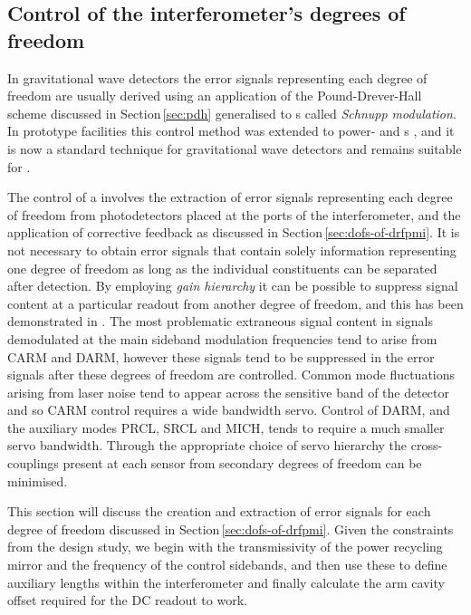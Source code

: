 \subsection{\label{sec:decoupled-sidebands}Control of the interferometer's degrees of freedom}
In gravitational wave detectors the error signals representing each degree of freedom are usually derived using an application of the Pound-Drever-Hall scheme discussed in Section\,\ref{sec:pdh} generalised to \MI{}s called \emph{Schnupp modulation}. In prototype facilities this control method was extended to power- \cite{Regehr1995} and \DRFPMI{}s \cite{Heinzel1998}, and it is now a standard technique for gravitational wave detectors and remains suitable for \ETLF{}.

The control of a \DRFPMI{} involves the extraction of error signals representing each degree of freedom from photodetectors placed at the ports of the interferometer, and the application of corrective feedback as discussed in Section\,\ref{sec:dofs-of-drfpmi}. It is not necessary to obtain error signals that contain solely information representing one degree of freedom as long as the individual constituents can be separated after detection. By employing \emph{gain hierarchy} it can be possible to suppress signal content at a particular readout from another degree of freedom, and this has been demonstrated in \LIGO{} \cite{Fritschel2001}. The most problematic extraneous signal content in signals demodulated at the main sideband modulation frequencies tend to arise from \gls{CARM} and \gls{DARM}, however these signals tend to be suppressed in the error signals after these degrees of freedom are controlled. Common mode fluctuations arising from laser noise tend to appear across the sensitive band of the detector and so \gls{CARM} control requires a wide bandwidth servo. Control of \gls{DARM}, and the auxiliary modes \gls{PRCL}, \gls{SRCL} and \gls{MICH}, tends to require a much smaller servo bandwidth. Through the appropriate choice of servo hierarchy the cross-couplings present at each sensor from secondary degrees of freedom can be minimised.

This section will discuss the creation and extraction of error signals for each degree of freedom discussed in Section\,\ref{sec:dofs-of-drfpmi}. Given the constraints from the design study, we begin with the transmissivity of the power recycling mirror and the frequency of the control sidebands, and then use these to define auxiliary lengths within the interferometer and finally calculate the arm cavity offset required for the \gls{DC} readout to work.

